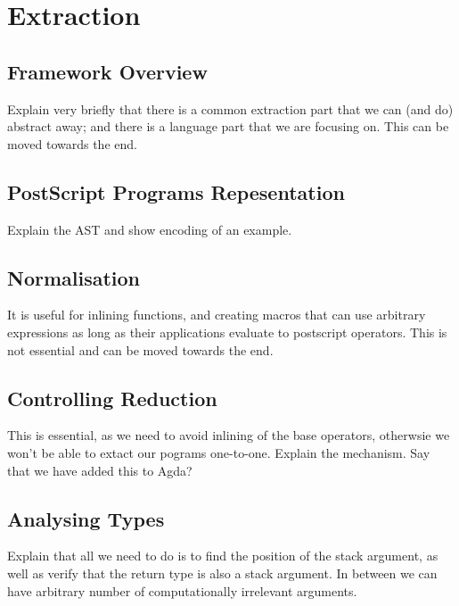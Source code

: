 \documentclass[sigplan,anonymous,review]{acmart}
\begin{document}




\section{Extraction}
\subsection{Framework Overview}
Explain very briefly that there is a common extraction part that we can (and do)
abstract away; and there is a language part that we are focusing on.  This can be
moved towards the end.

\subsection{PostScript Programs Repesentation}
Explain the AST and show encoding of an example.

\subsection{\label{sec:normalisation}Normalisation}
It is useful for inlining functions, and creating macros that can use arbitrary expressions
as long as their applications evaluate to postscript operators.
This is not essential and can be moved towards the end.

\subsection{\label{sec:controlling-reduction}Controlling Reduction}
This is essential, as we need to avoid inlining of the base operators, otherwsie
we won't be able to extact our pograms one-to-one.  Explain the mechanism.  Say that we have
added this to Agda?


\subsection{\label{sec:maptypes}Analysing Types}
Explain that all we need to do is to find the position of the stack argument, as well as
verify that the return type is also a stack argument.  In between we can have arbitrary
number of computationally irrelevant arguments.
\end{document}

